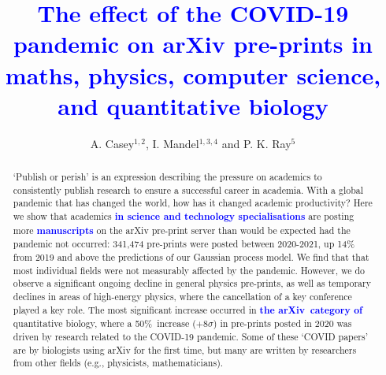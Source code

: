 \documentclass[]{rsos}%
\newcommand{\arxiv}{arXiv}
\newcommand{\change}[1]{\textcolor{blue}{\textbf{#1}}}
\begin{document}
\title{\change{The effect of the COVID-19 pandemic on arXiv pre-prints in maths, physics, computer science, and quantitative biology}}


\author{%
{A. Casey$^{1,2}$,  I. Mandel$^{1,3,4}$ and P. K. Ray$^{5}$}}

\address{$^1$School of Physics \& Astronomy, Monash University, Clayton 3800, Victoria, Australia\\
$^2$ARC Centre of Excellence for Astrophysics in Three Dimensions (ASTRO-3D), Australia\\
$^3$OzGrav, Australian Research Council Centre of Excellence for Gravitational Wave Discovery, Australia\\
$^4$Institute of Gravitational Wave Astronomy and School of Physics and Astronomy, University of Birmingham, Birmingham, B15 2TT, United Kingdom\\
$^5$Department of Mathematics, Imperial College London, London, United Kingdom
}

\subject{xxxxx, xxxxx, xxxx}



\begin{abstract}
`Publish or perish’ is an expression describing the pressure on academics to consistently publish research to ensure a successful career in academia. 
With a global pandemic that has changed the world, how has it changed academic productivity? 
Here we show that academics \change{in science and technology specialisations} are posting more \change{manuscripts} on the arXiv pre-print server than would be expected had the pandemic not occurred: 341,474 pre-prints were posted between 2020-2021, up 14\% from 2019 and above the predictions of our Gaussian process model.
We find that that most individual fields were not measurably affected by the pandemic.
However, we do observe a significant ongoing decline in general physics pre-prints, as well as temporary declines in areas of high-energy physics, where the cancellation of a key conference played a key role.
The most significant increase occurred in \change{the \arxiv\ category of} quantitative biology, where a 50\%~increase ($+8\sigma$) in pre-prints posted in 2020 was driven by research related to the COVID-19 pandemic. 
Some of these `COVID papers' are by biologists using arXiv for the first time, but many are written by researchers from other fields (e.g., physicists, mathematicians).
\end{abstract}
\end{document}
